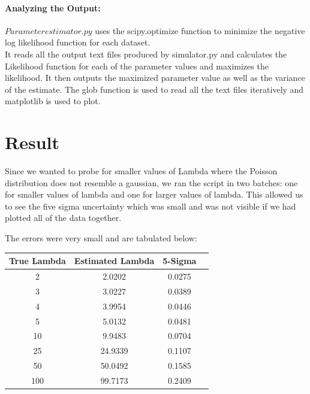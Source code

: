 \documentclass[12pt]{article}
\begin{document}
\paragraph{Analyzing the Output:}
$Parameterestimator.py$ uses the scipy.optimize function
 to minimize the negative log likelihood function for each dataset.\\
It reads all the output text files produced by simulator.py and calculates the Likelihood function for each of the parameter values and maximizes the likelihood. It then outputs the maximized parameter value as well as the variance of the estimate. The glob function is used to read all the text files iteratively and matplotlib is used to plot.

\vspace{0.5cm}







\section{Result}
Since we wanted to probe for smaller values of Lambda where the Poisson distribution does not resemble a gaussian, we ran the script in two batches: one for smaller values of lambda and one for larger values of lambda. This allowed us to see the five sigma uncertainty which was small and was not visible if we had plotted all of the data together.

The errors were very small and are tabulated below:
\begin{center}
	\begin{tabular}{||c c c c||} 
		\hline
		True Lambda & Estimated Lambda & 5-Sigma  \\ [0.5ex] 
		\hline\hline
		2 & 2.0202 & 0.0275  \\ 
		\hline
		3 & 3.0227 & 0.0389  \\
		\hline
		4 & 3.9954 & 0.0446  \\
		\hline
		5 & 5.0132 & 0.0481  \\
		\hline
		10 & 9.9483 & 0.0704  \\
		\hline
		25 & 24.9339 & 0.1107  \\
		\hline
		50 & 50.0492 & 0.1585 \\
		\hline
		100 & 99.7173 & 0.2409  \\[1ex]
		\hline
		 

	\end{tabular}
\end{center}
\end{document}
